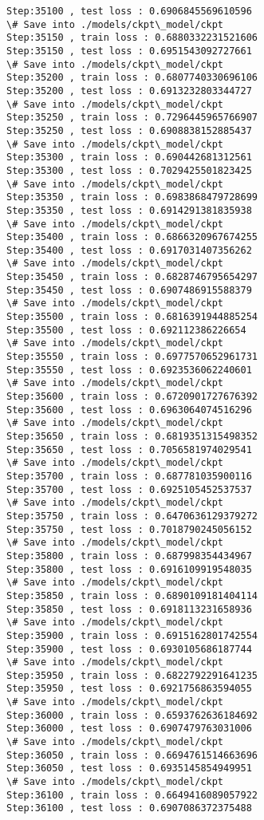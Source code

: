 \documentclass[11pt]{article}
\begin{document}
\begin{Verbatim}[commandchars=\\\{\}]
Step:35100 , test loss : 0.6906845569610596
\# Save into ./models/ckpt\_model/ckpt
Step:35150 , train loss : 0.6880332231521606
Step:35150 , test loss : 0.6951543092727661
\# Save into ./models/ckpt\_model/ckpt
Step:35200 , train loss : 0.6807740330696106
Step:35200 , test loss : 0.6913232803344727
\# Save into ./models/ckpt\_model/ckpt
Step:35250 , train loss : 0.7296445965766907
Step:35250 , test loss : 0.6908838152885437
\# Save into ./models/ckpt\_model/ckpt
Step:35300 , train loss : 0.690442681312561
Step:35300 , test loss : 0.7029425501823425
\# Save into ./models/ckpt\_model/ckpt
Step:35350 , train loss : 0.6983868479728699
Step:35350 , test loss : 0.6914291381835938
\# Save into ./models/ckpt\_model/ckpt
Step:35400 , train loss : 0.6866320967674255
Step:35400 , test loss : 0.6917031407356262
\# Save into ./models/ckpt\_model/ckpt
Step:35450 , train loss : 0.6828746795654297
Step:35450 , test loss : 0.6907486915588379
\# Save into ./models/ckpt\_model/ckpt
Step:35500 , train loss : 0.6816391944885254
Step:35500 , test loss : 0.692112386226654
\# Save into ./models/ckpt\_model/ckpt
Step:35550 , train loss : 0.6977570652961731
Step:35550 , test loss : 0.6923536062240601
\# Save into ./models/ckpt\_model/ckpt
Step:35600 , train loss : 0.6720901727676392
Step:35600 , test loss : 0.6963064074516296
\# Save into ./models/ckpt\_model/ckpt
Step:35650 , train loss : 0.6819351315498352
Step:35650 , test loss : 0.7056581974029541
\# Save into ./models/ckpt\_model/ckpt
Step:35700 , train loss : 0.687781035900116
Step:35700 , test loss : 0.6925105452537537
\# Save into ./models/ckpt\_model/ckpt
Step:35750 , train loss : 0.6470636129379272
Step:35750 , test loss : 0.7018790245056152
\# Save into ./models/ckpt\_model/ckpt
Step:35800 , train loss : 0.687998354434967
Step:35800 , test loss : 0.6916109919548035
\# Save into ./models/ckpt\_model/ckpt
Step:35850 , train loss : 0.6890109181404114
Step:35850 , test loss : 0.6918113231658936
\# Save into ./models/ckpt\_model/ckpt
Step:35900 , train loss : 0.6915162801742554
Step:35900 , test loss : 0.6930105686187744
\# Save into ./models/ckpt\_model/ckpt
Step:35950 , train loss : 0.6822792291641235
Step:35950 , test loss : 0.6921756863594055
\# Save into ./models/ckpt\_model/ckpt
Step:36000 , train loss : 0.6593762636184692
Step:36000 , test loss : 0.6907479763031006
\# Save into ./models/ckpt\_model/ckpt
Step:36050 , train loss : 0.6694761514663696
Step:36050 , test loss : 0.6935145854949951
\# Save into ./models/ckpt\_model/ckpt
Step:36100 , train loss : 0.6649416089057922
Step:36100 , test loss : 0.6907086372375488

\end{Verbatim}
\end{document}
